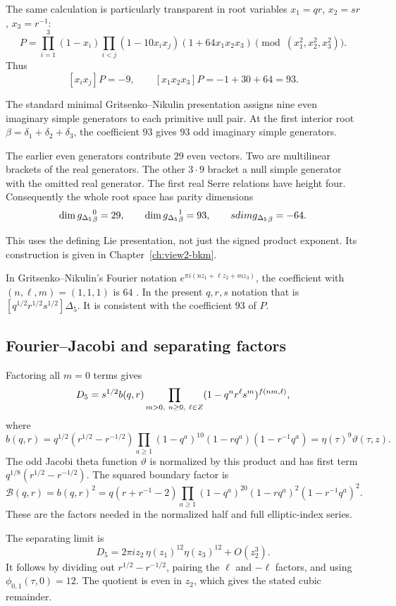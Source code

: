 The same calculation is particularly transparent in root variables
\(x_1=qr\), \(x_2=sr\), \(x_3=r^{-1}\):
\[
 P=
 \prod_{i=1}^3(1-x_i)
 \prod_{i<j}(1-10x_ix_j)
 (1+64x_1x_2x_3)
 \pmod{(x_1^2,x_2^2,x_3^2)}.
\]
Thus
\[
 [x_ix_j]P=-9,\qquad
 [x_1x_2x_3]P=-1+30+64=93.
\]

The standard minimal Gritsenko--Nikulin presentation assigns nine
even imaginary simple generators to each primitive null pair.
At the first interior root
\(\beta=\delta_1+\delta_2+\delta_3\), the coefficient \(93\)
gives \(93\) odd imaginary simple generators.

The earlier even generators contribute \(29\) even vectors.
Two are multilinear brackets of the real generators.
The other \(3\cdot9\) bracket a null simple generator with the
omitted real generator.  The first real Serre relations have
height four.
Consequently the whole root space has parity dimensions
\[
 \dim{g_{\Delta_5}}_\beta^{0}=29,\qquad
 \dim{g_{\Delta_5}}_\beta^{1}=93,\qquad
 sdim{g_{\Delta_5}}_\beta=-64.
\]

This uses the defining Lie presentation, not just the signed product
exponent.  Its construction is given in
Chapter~\ref{ch:view2-bkm}.

In Gritsenko--Nikulin's Fourier notation
\(e^{\pi i(nz_1+\ell z_2+mz_3)}\), the coefficient with
\((n,\ell,m)=(1,1,1)\) is \(64\)
\cite[(1.6)--(1.7)]{GN}.
In the present \(q,r,s\) notation that is
\([q^{1/2}r^{1/2}s^{1/2}]\Delta_5\).
It is consistent with the coefficient \(93\) of \(P\).

\subsection{Fourier--Jacobi and separating factors}

Factoring all \(m=0\) terms gives
\[
 D_5=s^{1/2}b(q,r)
 \prod_{m>0,\ n\geq0,\ \ell\in Z}
                (1-q^nr^\ell s^m)^{f(nm,\ell)},
\]
where
\[
 b(q,r)=q^{1/2}(r^{1/2}-r^{-1/2})
 \prod_{a\geq1}(1-q^a)^{10}(1-rq^a)(1-r^{-1}q^a)
 =\eta(\tau)^9\vartheta(\tau,z).
\]
The odd Jacobi theta function \(\vartheta\) is normalized by this
product and has first term \(q^{1/8}(r^{1/2}-r^{-1/2})\).
The squared boundary factor is
\[
 \mathcal B(q,r)=b(q,r)^2
 =q(r+r^{-1}-2)
   \prod_{a\geq1}(1-q^a)^{20}(1-rq^a)^2(1-r^{-1}q^a)^2.
\]
These are the factors needed in the normalized half and full
elliptic-index series.

The separating limit is
\[
 D_5=
 2\pi iz_2\,\eta(z_1)^{12}\eta(z_3)^{12}+O(z_2^3).
\]
It follows by dividing out \(r^{1/2}-r^{-1/2}\), pairing the
\(\ell\) and \(-\ell\) factors, and using
\(\phi_{0,1}(\tau,0)=12\).
The quotient is even in \(z_2\), which gives the stated cubic
remainder.

